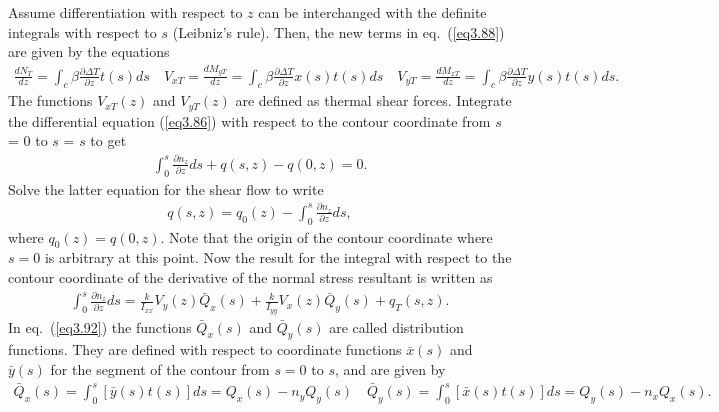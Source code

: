 \documentclass{AeroStructure-ERJohnson}
\begin{document}
Assume differentiation with respect to $z$ can be interchanged with the definite integrals with respect to $s$ (Leibniz's rule). Then, the new terms in eq.~(\ref{eq3.88}) are given by the equations
\begin{align}\label{eq3.89}
\frac{d N_{T}}{d z}=\int_{c} \beta \frac{\partial \Delta T}{\partial z} t(s) d s \quad V_{x T}=\frac{d M_{y T}}{d z}=\int_{c} \beta \frac{\partial \Delta T}{\partial z} x(s) t(s) d s \quad V_{y T}=\frac{d M_{x T}}{d z}=\int_{c} \beta \frac{\partial \Delta T}{\partial z} y(s) t(s) d s.
\end{align}
The functions $V_{x T}(z)$ and $V_{y T}(z)$ are defined as thermal shear forces. Integrate the differential equation (\ref{eq3.86}) with respect to the contour coordinate from $s$ = 0 to $s$ = $s$ to get
\begin{align}\label{eq3.90}
\int_{0}^{s} \frac{\partial n_{z}}{\partial z}ds+q(s, z)-q(0, z)=0.
\end{align}
Solve the latter equation for the shear flow to write
\begin{align}\label{eq3.91}
q(s, z)=q_{0}(z)-\int_{0}^{s} \frac{\partial n_{z}}{\partial z} d s,
\end{align}
where $q_{0}(z)=q(0, z)$. Note that the origin of the contour coordinate where $s = 0$ is arbitrary at this point. Now the result for the integral with respect to the contour coordinate of the derivative of the normal stress resultant is written as
\begin{align}\label{eq3.92}
\int_{0}^{s} \frac{\partial n_{z}}{\partial z} d s=\frac{k}{I_{x x}} V_{y}(z) \bar{Q}_{x}(s)+\frac{k}{I_{y y}} V_{x}(z) \bar{Q}_{y}(s)+q_{T}(s, z).
\end{align}
In eq.~(\ref{eq3.92}) the functions $\bar{Q}_{x}    (s)$ and $\bar{Q}_{y}(s)$ are called distribution functions. They are defined with respect to coordinate functions $\bar{x}(s)$ and $\bar{y}(s)$ for the segment of the contour from $s = 0$ to $s$, and are given by
\begin{align}\label{eq3.93}
\bar{Q}_{x}(s)=\int_{0}^{s}[\bar{y}(s) t(s)] d s=Q_{x}(s)-n_{y} Q_{y}(s) \quad \bar{Q}_{y}(s)=\int_{0}^{s}[\bar{x}(s) t(s)] d s=Q_{y}(s)-n_{x} Q_{x}(s).
\end{align}
\clearpage
\end{document}
